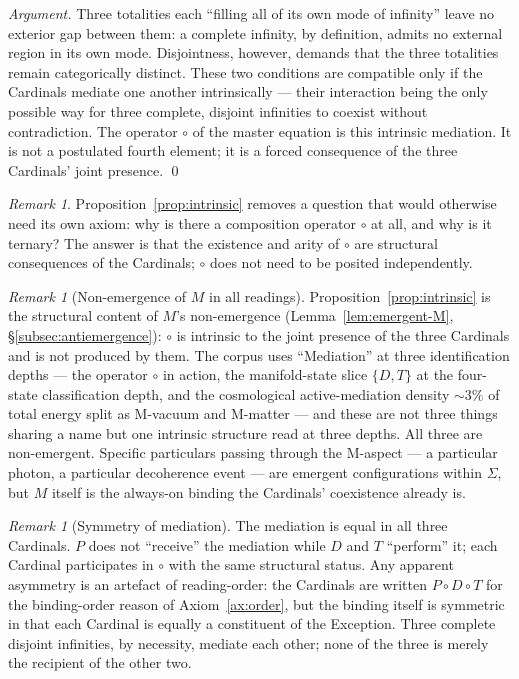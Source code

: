 \documentclass[11pt,a4paper]{article}
\theoremstyle{definition}
\theoremstyle{remark}
\newtheorem{remark}[theorem]{Remark}
\begin{document}
\begin{proof}[Argument]
Three totalities each ``filling all of its own mode of infinity'' leave no exterior gap between them: a complete infinity, by definition, admits no external region in its own mode. Disjointness, however, demands that the three totalities remain categorically distinct. These two conditions are compatible only if the Cardinals mediate one another intrinsically --- their interaction being the only possible way for three complete, disjoint infinities to coexist without contradiction. The operator $\circ$ of the master equation is this intrinsic mediation. It is not a postulated fourth element; it is a forced consequence of the three Cardinals' joint presence. \qed
\end{proof}

\begin{remark}
Proposition~\ref{prop:intrinsic} removes a question that would otherwise need its own axiom: why is there a composition operator $\circ$ at all, and why is it ternary? The answer is that the existence and arity of $\circ$ are structural consequences of the Cardinals; $\circ$ does not need to be posited independently.
\end{remark}

\begin{remark}[Non-emergence of $M$ in all readings]\label{rem:M-nonemergent}
Proposition~\ref{prop:intrinsic} is the structural content of $M$'s non-emergence (Lemma~\ref{lem:emergent-M}, \S\ref{subsec:antiemergence}): $\circ$ is intrinsic to the joint presence of the three Cardinals and is not produced by them. The corpus uses ``Mediation'' at three identification depths --- the operator $\circ$ in action, the manifold-state slice $\{D,T\}$ at the four-state classification depth, and the cosmological active-mediation density $\sim 3\%$ of total energy split as M-vacuum and M-matter --- and these are not three things sharing a name but one intrinsic structure read at three depths. All three are non-emergent. Specific particulars passing through the M-aspect ---  a particular photon, a particular decoherence event --- are emergent configurations within $\Sigma$, but $M$ itself is the always-on binding the Cardinals' coexistence already is.
\end{remark}

\begin{remark}[Symmetry of mediation]\label{rem:mediation-symmetry}
The mediation is equal in all three Cardinals. $P$ does not ``receive'' the mediation while $D$ and $T$ ``perform'' it; each Cardinal participates in $\circ$ with the same structural status. Any apparent asymmetry is an artefact of reading-order: the Cardinals are written $P \circ D \circ T$ for the binding-order reason of Axiom~\ref{ax:order}, but the binding itself is symmetric in that each Cardinal is equally a constituent of the Exception. Three complete disjoint infinities, by necessity, mediate each other; none of the three is merely the recipient of the other two.
\end{remark}
\end{document}
